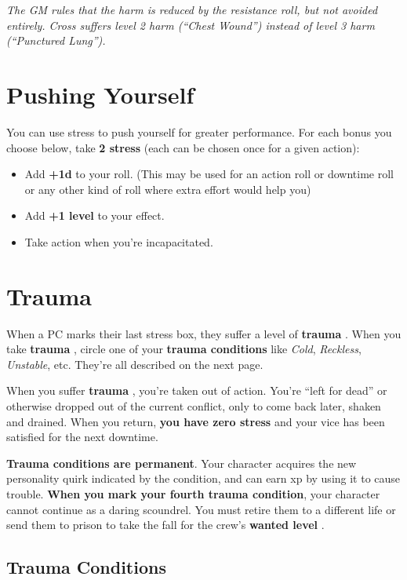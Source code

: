 \documentclass[11pt,oneside]{book}
\newcommand{\gameterm}[1]{\textbf{#1}}
\begin{document}
\emph{The GM rules that the harm is reduced by the resistance roll, but not avoided entirely. Cross suffers level 2 harm (“Chest Wound”) instead of level 3 harm (“Punctured Lung”).}

\section{Pushing Yourself}

You can use stress to push yourself for greater performance. For each bonus you choose below, take \textbf{2 stress} (each can be chosen once for a given action):

\begin{itemize}
	\item Add \textbf{+1d} to your roll. (This may be used for an action roll or downtime roll or any other kind of roll where extra effort would help you)
	\item Add \textbf{+1 level} to your effect.
	\item Take action when you’re incapacitated.
\end{itemize}

\section{Trauma}

When a PC marks their last stress box, they suffer a level of \gameterm{trauma} . When you take \gameterm{trauma} , circle one of your \textbf{trauma conditions} like \emph{Cold}, \emph{Reckless}, \emph{Unstable}, etc. They’re all described on the next page.

When you suffer \gameterm{trauma} , you’re taken out of action. You’re “left for dead” or otherwise dropped out of the current conflict, only to come back later, shaken and drained. When you return, \textbf{you have zero stress} and your vice has been satisfied for the next downtime.

\textbf{Trauma conditions are permanent}. Your character acquires the new personality quirk indicated by the condition, and can earn xp by using it to cause trouble. \textbf{When you mark your fourth trauma condition}, your character cannot continue as a daring scoundrel. You must retire them to a different life or send them to prison to take the fall for the crew’s \gameterm{wanted level} .

\subsection{Trauma Conditions}
\end{document}
